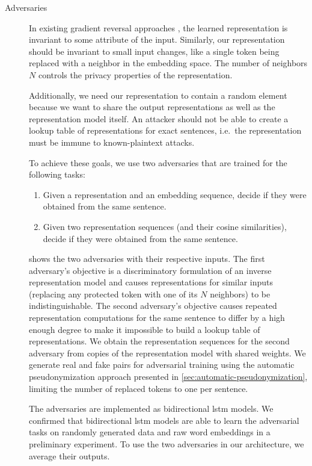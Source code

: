 \begin{description}
    \item[Adversaries]
    In existing gradient reversal approaches \citep{ganin2016domain,feutry2018learning,elazar2018adversarial}, the learned representation is invariant to some attribute of the input.
    Similarly, our representation should be invariant to small input changes, like a single token being replaced with a neighbor in the embedding space.
    The number of neighbors $N$ controls the privacy properties of the representation.
    
    Additionally, we need our representation to contain a random element because we want to share the output representations as well as the representation model itself.
    An attacker should not be able to create a lookup table of representations for exact sentences, i.e.\ the representation must be immune to known-plaintext attacks.
    
    To achieve these goals, we use two adversaries that are trained for the following tasks:
    \begin{enumerate}
        \item Given a representation and an embedding sequence, decide if they were obtained from the same sentence.
        \item Given two representation sequences (and their cosine similarities), decide if they were obtained from the same sentence.
    \end{enumerate}
    
     shows the two adversaries with their respective inputs.
    The first adversary's objective is a discriminatory formulation of an inverse representation model and causes representations for similar inputs (replacing any protected token with one of its $N$ neighbors) to be indistinguishable.
    The second adversary's objective causes repeated representation computations for the same sentence to differ by a high enough degree to make it impossible to build a lookup table of representations.
    We obtain the representation sequences for the second adversary from copies of the representation model with shared weights.
    We generate real and fake pairs for adversarial training using the automatic pseudonymization approach presented in \cref{sec:automatic-pseudonymization}, limiting the number of replaced tokens to one per sentence.
    
    The adversaries are implemented as bidirectional \ac{lstm} models.
    We confirmed that bidirectional \ac{lstm} models are able to learn the adversarial tasks on randomly generated data and raw word embeddings in a preliminary experiment.
    To use the two adversaries in our architecture, we average their outputs.
    

\end{description}
